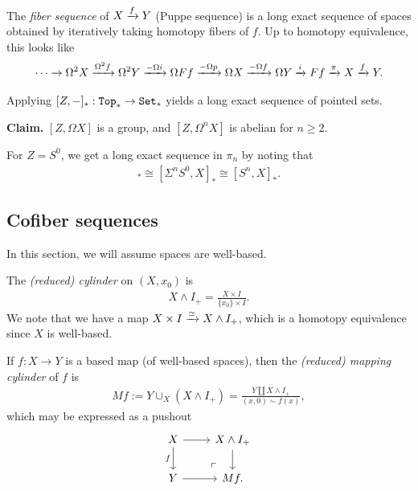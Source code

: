\documentclass{article}[11pt]
\newcommand{\smashprod}{\wedge} %
\begin{document}
\begin{definition} The \textit{fiber sequence} of $X\xrightarrow{f} Y$ (Puppe sequence) is a long exact sequence of spaces obtained by iteratively taking homotopy fibers of $f$. Up to homotopy equivalence, this looks like
\begin{align*}
	\cdots \to \Omega^2 X \xrightarrow{\Omega^2 f} \Omega^2 Y \xrightarrow{-\Omega i} \Omega Ff \xrightarrow{-\Omega p} \Omega X \xrightarrow{-\Omega f} \Omega Y \xrightarrow{i} Ff \xrightarrow{\pi} X\xrightarrow{f} Y.
\end{align*}
\end{definition}

\begin{theorem} Applying $[Z,-]_\ast : \texttt{Top}_\ast \to \texttt{Set}_\ast$ yields a long exact sequence of pointed sets.
\end{theorem}

\textbf{Claim.} $[Z,\Omega X]$ is a group, and $[Z,\Omega^n X]$ is abelian for $n\geq 2$.


\begin{note} For $Z = S^0$, we get a long exact sequence in $\pi_n$ by noting that
\begin{align*}
	[S^0, \Omega^n X]_\ast \cong [\Sigma^n S^0, X]_\ast \cong [S^n, X]_\ast.
\end{align*}
\end{note}




\subsection{Cofiber sequences}

In this section, we will assume spaces are well-based.

\begin{definition} The \textit{(reduced) cylinder} on $(X,x_0)$ is
\begin{align*}
	X \smashprod I_+ = \frac{X\times I}{\{x_0\}\times I}.
\end{align*}
We note that we have a map $X\times I \xto{\simeq} X\smashprod I_+$, which is a homotopy equivalence since $X$ is well-based.
\end{definition}

\begin{definition} If $f: X \to Y$ is a based map (of well-based spaces), then the \textit{(reduced) mapping cylinder} of $f$ is
\begin{align*}
	Mf := Y \cup_X (X\smashprod I_+) = \frac{Y \amalg X\smashprod I_+}{(x,0)\sim f(x)},
\end{align*}
which may be expressed as a pushout
\[
	\begin{tikzcd}
	X\rar\dar["f" left] & X\smashprod I_+ \dar \\
	Y\rar & Mf.\po
	\end{tikzcd}
\]
\end{definition}
\end{document}
